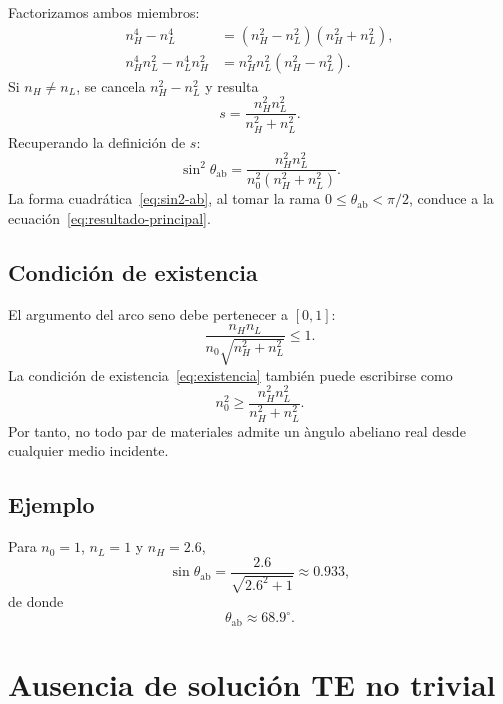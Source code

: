 \documentclass[10pt,a4paper]{article}
\begin{document}
Factorizamos ambos miembros:
\begin{align}
n_H^4-n_L^4&=(n_H^2-n_L^2)(n_H^2+n_L^2),\\
n_H^4n_L^2-n_L^4n_H^2&=n_H^2n_L^2(n_H^2-n_L^2).
\end{align}
Si $n_H\neq n_L$, se cancela $n_H^2-n_L^2$ y resulta
\begin{equation}
s=\frac{n_H^2n_L^2}{n_H^2+n_L^2}.
\end{equation}
Recuperando la definici\'on de $s$:
\begin{equation}
\boxed{
\sin^2\theta_{\mathrm{ab}}
=
\frac{n_H^2n_L^2}{n_0^2(n_H^2+n_L^2)}.}
\label{eq:sin2-ab}
\end{equation}
La forma cuadr\'atica~\eqref{eq:sin2-ab}, al tomar la rama $0\leq\theta_{\mathrm{ab}}<\pi/2$, conduce a la ecuaci\'on~\eqref{eq:resultado-principal}.

\subsection*{Condici\'on de existencia}

El argumento del arco seno debe pertenecer a $[0,1]$:
\begin{equation}
\frac{n_Hn_L}{n_0\sqrt{n_H^2+n_L^2}}\leq1.
\label{eq:existencia}
\end{equation}
La condici\'on de existencia~\eqref{eq:existencia} tambi\'en puede escribirse como
\begin{equation}
n_0^2\geq\frac{n_H^2n_L^2}{n_H^2+n_L^2}.
\end{equation}
Por tanto, no todo par de materiales admite un \`angulo abeliano real desde cualquier medio incidente.

\subsection*{Ejemplo}

Para $n_0=1$, $n_L=1$ y $n_H=2.6$,
\begin{equation}
\sin\theta_{\mathrm{ab}}
=\frac{2.6}{\sqrt{2.6^2+1}}
\approx0.933,
\end{equation}
de donde
\begin{equation}
\theta_{\mathrm{ab}}\approx68.9^{\circ}.
\end{equation}

\section{Ausencia de soluci\'on TE no trivial}
\end{document}
